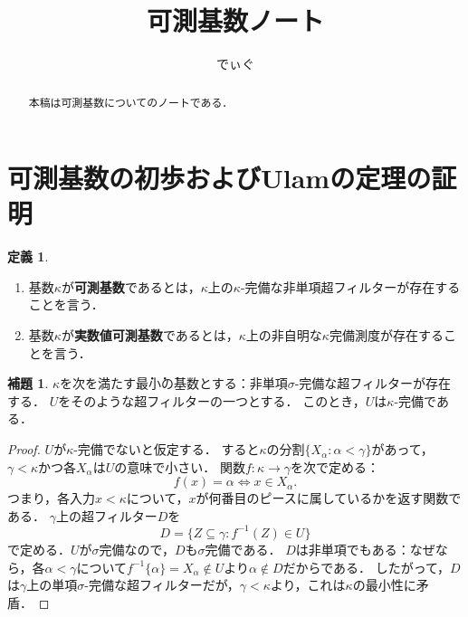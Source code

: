 \documentclass[uplatex]{jsarticle}
\title{\vspace{-2cm} \HUGE 可測基数ノート}
\author{でぃぐ}
\renewcommand\subset{\subseteq}
\theoremstyle{definition}
\newtheorem{defi}[thm]{定義}
\newtheorem{lem}[thm]{補題}
\begin{document}
	
	\maketitle
	
	\begin{abstract}
		本稿は可測基数についてのノートである．
	\end{abstract}
	
	\tableofcontents
	
	
	\section{可測基数の初歩およびUlamの定理の証明}
	
	\begin{defi}
		\begin{enumerate}
			\item 基数$\kappa$が\textbf{可測基数}であるとは，$\kappa$上の$\kappa$-完備な非単項超フィルターが存在することを言う．
			\item 基数$\kappa$が\textbf{実数値可測基数}であるとは，$\kappa$上の非自明な$\kappa$完備測度が存在することを言う．
		\end{enumerate}
	\end{defi}

	\begin{lem}
		$\kappa$を次を満たす\.最\.小\.の基数とする：非単項$\sigma$-完備な超フィルターが存在する．
		$U$をそのような超フィルターの一つとする．
		このとき，$U$は$\kappa$-完備である．
	\end{lem}
	\begin{proof}
		$U$が$\kappa$-完備でないと仮定する．
		すると$\kappa$の分割$\{ X_\alpha : \alpha < \gamma \}$があって，$\gamma < \kappa$かつ各$X_\alpha$は$U$の意味で小さい．
		関数$f \colon \kappa \to \gamma$を次で定める：
		\[
			f(x) = \alpha \iff x \in X_\alpha.
		\]
		つまり，各入力$x < \kappa$について，$x$が何番目のピースに属しているかを返す関数である．
		$\gamma$上の超フィルター$D$を
		\[
			D = \{ Z \subset \gamma : f^{-1}(Z) \in U \}
		\]
		で定める．$U$が$\sigma$完備なので，$D$も$\sigma$完備である．
		$D$は非単項でもある：なぜなら，各$\alpha < \gamma$について$f^{-1}\{\alpha\} = X_\alpha \not \in U$より$\alpha \not \in D$だからである．
		したがって，$D$は$\gamma$上の単項$\sigma$-完備な超フィルターだが，$\gamma < \kappa$より，これは$\kappa$の最小性に矛盾．
	\end{proof}
\end{document}
